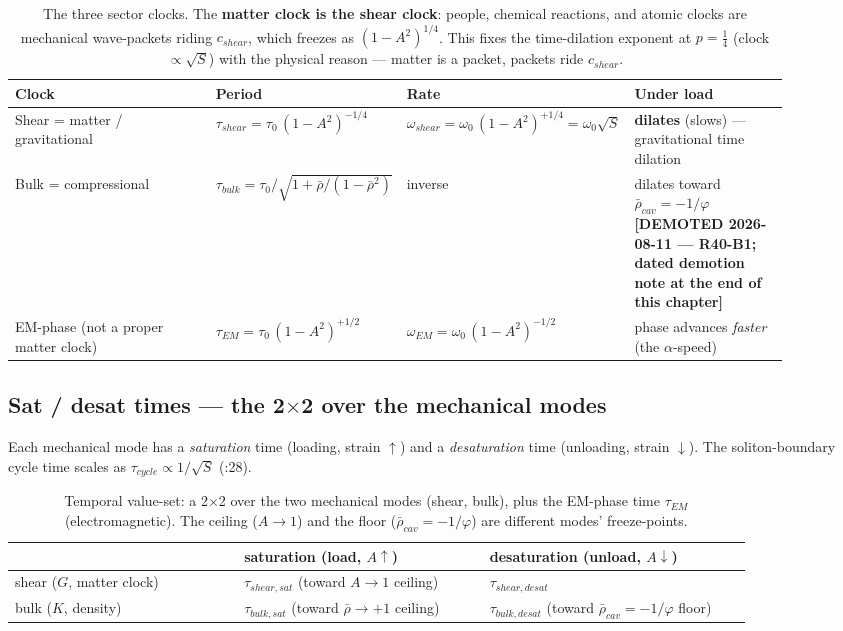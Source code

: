\begin{table}[htbp]
\centering\footnotesize
\setlength{\tabcolsep}{4pt}
\begin{tabular}{@{}p{0.26\linewidth} p{0.22\linewidth} p{0.22\linewidth} p{0.20\linewidth}@{}}
\toprule
\textbf{Clock} & \textbf{Period} & \textbf{Rate} & \textbf{Under load} \\
\midrule
Shear = matter / gravitational & $\tau_{shear} = \tau_0\,(1-A^2)^{-1/4}$ & $\omega_{shear} = \omega_0\,(1-A^2)^{+1/4} = \omega_0\sqrt{S}$ & \textbf{dilates} (slows) --- gravitational time dilation \\
Bulk = compressional & $\tau_{bulk} = \tau_0 / \sqrt{1 + \bar{\rho}/(1-\bar{\rho}^2)}$ & inverse & dilates toward $\bar{\rho}_{cav} = -1/\varphi$ \textbf{[DEMOTED 2026-08-11 --- R40-B1; dated demotion note at the end of this chapter]} \\
EM-phase (not a proper matter clock) & $\tau_{EM} = \tau_0\,(1-A^2)^{+1/2}$ & $\omega_{EM} = \omega_0\,(1-A^2)^{-1/2}$ & phase advances \emph{faster} (the $\alpha$-speed) \\
\bottomrule
\end{tabular}
\caption{The three sector clocks. The \textbf{matter clock is the shear clock}: people, chemical reactions, and atomic clocks are mechanical wave-packets riding $c_{shear}$, which freezes as $(1-A^2)^{1/4}$. This fixes the time-dilation exponent at $p = \tfrac14$ (clock $\propto \sqrt{S}$) with the physical reason --- matter is a packet, packets ride $c_{shear}$.}
\label{tab:vol9_sector_clocks}
\end{table}

\subsection{Sat / desat times --- the 2$\times$2 over the mechanical modes}
\label{subsec:vol9_sat_desat}

Each mechanical mode has a \emph{saturation} time (loading, strain $\uparrow$) and a \emph{desaturation} time (unloading, strain $\downarrow$). The soliton-boundary cycle time scales as $\tau_{cycle} \propto 1/\sqrt{S}$ (:28).

\begin{table}[htbp]
\centering\small
\begin{tabular}{@{}p{0.28\linewidth} p{0.30\linewidth} p{0.32\linewidth}@{}}
\toprule
 & \textbf{saturation (load, $A\uparrow$)} & \textbf{desaturation (unload, $A\downarrow$)} \\
\midrule
shear ($G$, matter clock) & $\tau_{shear,sat}$ (toward $A\to1$ ceiling) & $\tau_{shear,desat}$ \\
bulk ($K$, density) & $\tau_{bulk,sat}$ (toward $\bar{\rho}\to+1$ ceiling) & $\tau_{bulk,desat}$ (toward $\bar{\rho}_{cav}=-1/\varphi$ floor) \\
\bottomrule
\end{tabular}
\caption{Temporal value-set: a 2$\times$2 over the two mechanical modes (shear, bulk), plus the EM-phase time $\tau_{EM}$ (electromagnetic). The ceiling ($A\to1$) and the floor ($\bar{\rho}_{cav}=-1/\varphi$) are different modes' freeze-points.}
\label{tab:vol9_sat_desat}
\end{table}

